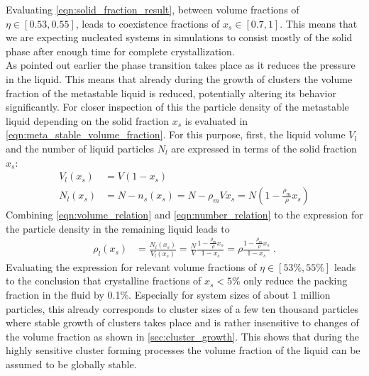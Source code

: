 Evaluating \autoref{eqn:solid_fraction_result}, between volume fractions of $\eta \in [0.53,0.55]$, leads to coexistence fractions of $x_s \in [0.7,1]$. This means that we are expecting nucleated systems in simulations to consist mostly of the solid phase after enough time for complete crystallization.\\

As pointed out earlier the phase transition takes place as it reduces the pressure in the liquid. This means that already during the growth of clusters the volume fraction of the metastable liquid is reduced, potentially altering its behavior significantly. For closer inspection of this the particle density of the metastable liquid depending on the solid fraction $x_s$ is evaluated in \autoref{eqn:meta_stable_volume_fraction}. For this purpose, first, the liquid volume $V_l$ and the number of liquid particles $N_l$ are expressed in terms of the solid fraction $x_s$:
\begin{align}
\label{eqn:volume_relation}
V_l(x_s) & = V(1-x_s)\\
\label{eqn:number_relation}
N_l(x_s) & = N-n_s(x_s) = N - \rho_m V x_s = N(1-\frac{\rho_m}{\rho}x_s)
\end{align}
Combining \autoref{eqn:volume_relation} and \autoref{eqn:number_relation} to the expression for the particle density in the remaining liquid leads to
\begin{align}
\label{eqn:meta_stable_volume_fraction}
\rho_l(x_s) &= \frac{N_l (x_s) }{ V_l(x_s) } = \frac{N}{V} \frac{1-\frac{\rho_m}{\rho}x_s}{1-x_s} = \rho \frac{1-\frac{\rho_m}{\rho}x_s}{1-x_s} \; \text{.}
\end{align}
Evaluating the expression for relevant volume fractions of $\eta \in [53\%, 55\%]$ leads to the conclusion that crystalline fractions of $x_s < 5\%$ only reduce the packing fraction in the fluid by 0.1\%. Especially for system sizes of about 1 million particles, this already corresponds to cluster sizes of a few ten thousand particles where stable growth of clusters takes place and is rather insensitive to changes of the volume fraction as shown in \autoref{sec:cluster_growth}. This shows that during the highly sensitive cluster forming processes the volume fraction of the liquid can be assumed to be globally stable.
